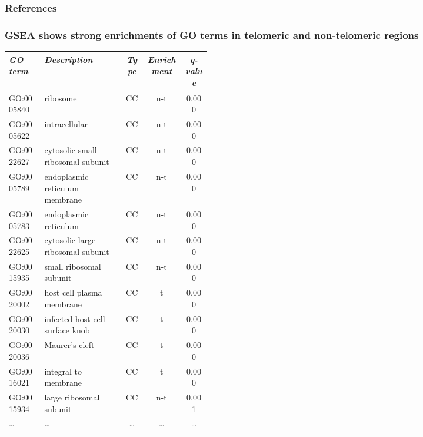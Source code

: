 \documentclass[xcolor=dvipsnames]{beamer}
\begin{document}
\begin{frame}
  \frametitle{References}
  
  
\end{frame}

\begin{frame}[noframenumbering]

\end{frame}

\begin{frame}[noframenumbering]
\frametitle{GSEA shows strong enrichments of GO terms in telomeric and
non-telomeric regions}

\begin{table}
\footnotesize
\vspace{10pt}
\begin{center}
\begin{tabular}{lp{0.4\linewidth}ccc}
\hline
\emph{GO term }&  \emph{Description} & \emph{Type} & \emph{Enrichment} &
\emph{q-value}  \\
\hline
GO:0005840 & ribosome & CC & n-t & 0.000\\
GO:0005622 & intracellular & CC & n-t & 0.000\\
GO:0022627 & cytosolic small ribosomal subunit & CC & n-t & 0.000\\
GO:0005789 & endoplasmic reticulum membrane & CC & n-t & 0.000\\
GO:0005783 & endoplasmic reticulum & CC & n-t & 0.000\\
GO:0022625 & cytosolic large ribosomal subunit & CC & n-t & 0.000\\
GO:0015935 & small ribosomal subunit & CC & n-t & 0.000\\
GO:0020002 & host cell plasma membrane & CC & t & 0.000\\
GO:0020030 & infected host cell surface knob & CC & t & 0.000\\
GO:0020036 & Maurer's cleft & CC & t & 0.000\\
GO:0016021 & integral to membrane & CC & t & 0.000\\
GO:0015934 & large ribosomal subunit & CC & n-t & 0.001\\
\dots & \dots & \dots & \dots & \dots \\
\end{tabular}
\end{center}
\end{table}
\end{frame}
\end{document}
